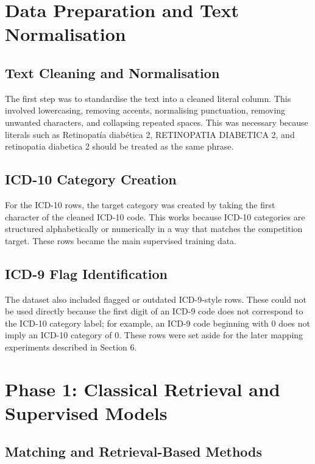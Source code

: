 \documentclass[9pt,a4paper,twoside]{utils/tau-class/tau}
\begin{document}
\section{Data Preparation and Text Normalisation}

\subsection{Text Cleaning and Normalisation}

The first step was to standardise the text into a cleaned literal column. This involved lowercasing, removing accents, normalising punctuation, removing unwanted characters, and collapsing repeated spaces. This was necessary because literals such as Retinopat\'ia diab\'etica 2, RETINOPATIA DIABETICA 2, and retinopatia diabetica 2 should be treated as the same phrase.

\subsection{ICD-10 Category Creation}

For the ICD-10 rows, the target category was created by taking the first character of the cleaned ICD-10 code. This works because ICD-10 categories are structured alphabetically or numerically in a way that matches the competition target. These rows became the main supervised training data.

\subsection{ICD-9 Flag Identification}

The dataset also included flagged or outdated ICD-9-style rows. These could not be used directly because the first digit of an ICD-9 code does not correspond to the ICD-10 category label; for example, an ICD-9 code beginning with 0 does not imply an ICD-10 category of 0. These rows were set aside for the later mapping experiments described in Section 6.

\section{Phase 1: Classical Retrieval and Supervised Models}

\subsection{Matching and Retrieval-Based Methods}
\end{document}

